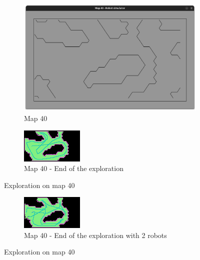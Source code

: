 \documentclass[../main.tex]{subfiles}
\begin{document}
\begin{figure}[H]
	\centering
	\begin{subfigure}{0.45\textwidth}
		\centering
		\includegraphics[width=\textwidth]{IMAGES/part5/map40.png}
		\caption{Map 40}
	\end{subfigure}
	\hfill
	\begin{subfigure}{0.45\textwidth}
		\centering
		\includegraphics[width=\textwidth]{IMAGES/part5/map40_explored_1robot.png}
		\caption{Map 40 - End of the exploration}
	\end{subfigure}
	\caption{Exploration on map 40}
	\label{fig:explo_40}
	\vfill
	\begin{subfigure}{0.45\textwidth}
		\centering
		\includegraphics[width=\textwidth]{IMAGES/part5/map40_explored_2robot.png}
		\caption{Map 40 - End of the exploration with 2 robots}
	\end{subfigure}
	\caption{Exploration on map 40}
	\label{fig:explo_40_2}
\end{figure}
\end{document}
